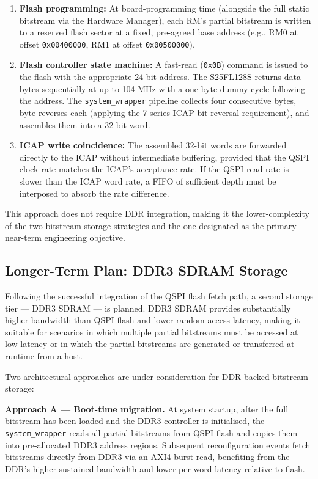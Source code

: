 \begin{enumerate}
  \item \textbf{Flash programming:} At board-programming time (alongside the full static bitstream via the Hardware Manager), each RM's partial bitstream is written to a reserved flash sector at a fixed, pre-agreed base address (e.g., RM0 at offset \texttt{0x00400000}, RM1 at offset \texttt{0x00500000}).
  \item \textbf{Flash controller state machine:} A fast-read (\texttt{0x0B}) command is issued to the flash with the appropriate 24-bit address. The S25FL128S returns data bytes sequentially at up to 104 MHz with a one-byte dummy cycle following the address. The \texttt{system\_wrapper} pipeline collects four consecutive bytes, byte-reverses each (applying the 7-series ICAP bit-reversal requirement), and assembles them into a 32-bit word.
  \item \textbf{ICAP write coincidence:} The assembled 32-bit words are forwarded directly to the ICAP without intermediate buffering, provided that the QSPI clock rate matches the ICAP's acceptance rate. If the QSPI read rate is slower than the ICAP word rate, a FIFO of sufficient depth must be interposed to absorb the rate difference.
\end{enumerate}
This approach does not require DDR integration, making it the lower-complexity of the two bitstream storage strategies and the one designated as the primary near-term engineering objective.

\subsection{Longer-Term Plan: DDR3 SDRAM Storage}

Following the successful integration of the QSPI flash fetch path, a second storage tier — DDR3 SDRAM — is planned. DDR3 SDRAM provides substantially higher bandwidth than QSPI flash and lower random-access latency, making it suitable for scenarios in which multiple partial bitstreams must be accessed at low latency or in which the partial bitstreams are generated or transferred at runtime from a host.

Two architectural approaches are under consideration for DDR-backed bitstream storage:

\textbf{Approach A — Boot-time migration.} At system startup, after the full bitstream has been loaded and the DDR3 controller is initialised, the \texttt{system\_wrapper} reads all partial bitstreams from QSPI flash and copies them into pre-allocated DDR3 address regions. Subsequent reconfiguration events fetch bitstreams directly from DDR3 via an AXI4 burst read, benefiting from the DDR's higher sustained bandwidth and lower per-word latency relative to flash.

